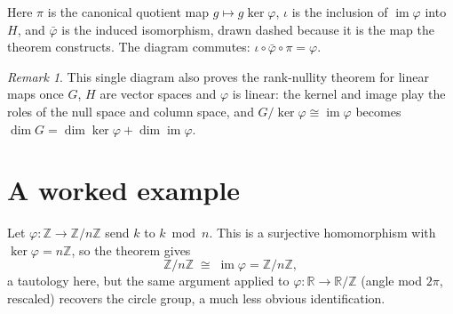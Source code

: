 \documentclass[11pt]{article}
\theoremstyle{plain}
\theoremstyle{definition}
\theoremstyle{remark}
\newtheorem*{remark}{Remark}
\begin{document}
Here $\pi$ is the canonical quotient map $g \mapsto g\ker\varphi$, $\iota$
is the inclusion of $\operatorname{im}\varphi$ into $H$, and $\bar\varphi$
is the induced isomorphism, drawn dashed because it is the map the
theorem constructs. The diagram commutes: $\iota \circ \bar\varphi \circ
\pi = \varphi$.

\begin{remark}
This single diagram also proves the rank-nullity theorem for linear maps
once $G$, $H$ are vector spaces and $\varphi$ is linear: the kernel and
image play the roles of the null space and column space, and
$G/\ker\varphi \cong \operatorname{im}\varphi$ becomes
$\dim G = \dim\ker\varphi + \dim\operatorname{im}\varphi$.
\end{remark}

\section{A worked example}

Let $\varphi : \mathbb{Z} \to \mathbb{Z}/n\mathbb{Z}$ send $k$ to
$k \bmod n$. This is a surjective homomorphism with
$\ker\varphi = n\mathbb{Z}$, so the theorem gives
\[
  \mathbb{Z} / n\mathbb{Z} \;\cong\; \operatorname{im}\varphi
  = \mathbb{Z}/n\mathbb{Z},
\]
a tautology here, but the same argument applied to
$\varphi : \mathbb{R} \to \mathbb{R}/\mathbb{Z}$ (angle mod $2\pi$,
rescaled) recovers the circle group, a much less obvious identification.
\end{document}
